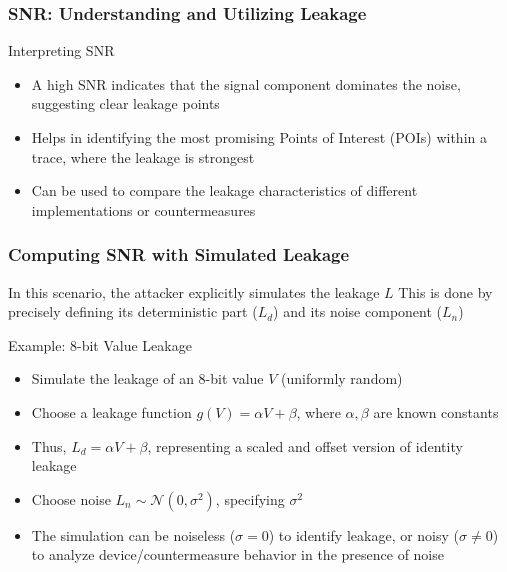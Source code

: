 \begin{frame}
\frametitle{SNR: Understanding and Utilizing Leakage}
    \begin{block}{Interpreting SNR}
        \begin{itemize}
            \item A high SNR indicates that the signal component dominates the noise, suggesting clear leakage points
            \item Helps in identifying the most promising Points of Interest (POIs) within a trace, where the leakage is strongest
            \item Can be used to compare the leakage characteristics of different implementations or countermeasures
        \end{itemize}
    \end{block}
\end{frame}








\begin{frame}
    \frametitle{Computing SNR with Simulated Leakage}
    
            In this scenario, the attacker explicitly simulates the leakage $L$ \newline
            This is done by precisely defining its deterministic part ($L_d$) and its noise component ($L_n$)
   

    \begin{block}{Example: 8-bit Value Leakage}
        \begin{itemize}
            \item Simulate the leakage of an 8-bit value $V$ (uniformly random)
            \item Choose a leakage function $g(V) = \alpha V + \beta$, where $\alpha, \beta$ are known constants
            \item Thus, $L_d = \alpha V + \beta$, representing a scaled and offset version of identity leakage
            \item Choose noise $L_n \sim \mathcal{N}(0, \sigma^2)$, specifying $\sigma^2$
            \item The simulation can be noiseless ($\sigma = 0$) to identify leakage, or noisy ($\sigma \ne 0$) to analyze device/countermeasure behavior in the presence of noise
        \end{itemize}
    \end{block}
\end{frame}


